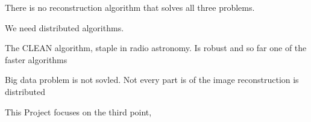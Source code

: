 There is no reconstruction algorithm that solves all three problems. 

We need distributed algorithms.

The CLEAN algorithm, staple in radio astronomy.
Is robust and so far one of the faster algorithms

Big data problem is not sovled. Not every part is of the image reconstruction is distributed


This Project focuses on the third point, 
